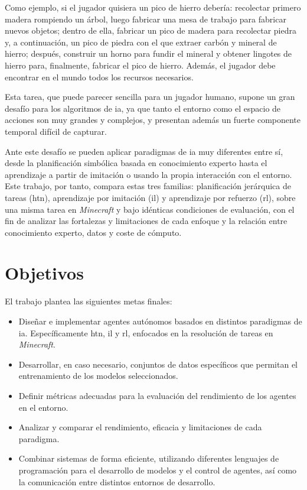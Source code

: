 Como ejemplo, si el jugador quisiera un pico de hierro debería: recolectar primero madera rompiendo un árbol, luego fabricar una mesa de trabajo para 
fabricar nuevos objetos; dentro de ella, fabricar un pico de madera para recolectar piedra y, a continuación, un pico de piedra 
con el que extraer carbón y mineral de hierro; después, construir un horno para fundir el mineral y obtener lingotes de hierro para, 
finalmente, fabricar el pico de hierro. Además, el jugador debe encontrar en el mundo todos los recursos necesarios.

Esta tarea, que puede parecer sencilla para un jugador humano, supone un gran desafío para
los algoritmos de \gls{ia}, ya que tanto el entorno como el espacio de acciones son muy grandes y complejos,
y presentan además un fuerte componente temporal difícil de capturar.

Ante este desafío se pueden aplicar paradigmas de \gls{ia} muy diferentes entre sí,
desde la planificación simbólica basada en conocimiento experto
hasta el aprendizaje a partir de imitación o usando la propia interacción con el entorno.
Este trabajo, por tanto, compara estas tres familias: planificación jerárquica de tareas (\gls{htn}),
aprendizaje por imitación (\gls{il}) y aprendizaje por refuerzo (\gls{rl}), sobre una misma tarea
en \textit{Minecraft} y bajo idénticas condiciones de evaluación, con el fin de analizar
las fortalezas y limitaciones de cada enfoque y 
la relación entre conocimiento experto, datos y coste de cómputo.

\section{Objetivos}
El trabajo plantea las siguientes metas finales:
\begin{itemize}
    \item Diseñar e implementar agentes autónomos basados en distintos paradigmas de \gls{ia}. Específicamente \gls{htn}, \gls{il} y \gls{rl}, enfocados en la resolución de tareas en \textit{Minecraft}.
    \item Desarrollar, en caso necesario, conjuntos de datos específicos que permitan el entrenamiento de los modelos seleccionados.
    \item Definir métricas adecuadas para la evaluación del rendimiento de los agentes en el entorno.
    \item Analizar y comparar el rendimiento, eficacia y limitaciones de cada paradigma.
    \item Combinar sistemas de forma eficiente, utilizando diferentes lenguajes de programación para el desarrollo de modelos 
    y el control de agentes, así como la comunicación entre distintos entornos de desarrollo.
\end{itemize}

